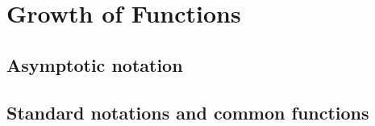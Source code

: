 \section{Growth of Functions}

\subsection{Asymptotic notation}
\subsection{Standard notations and common functions}
